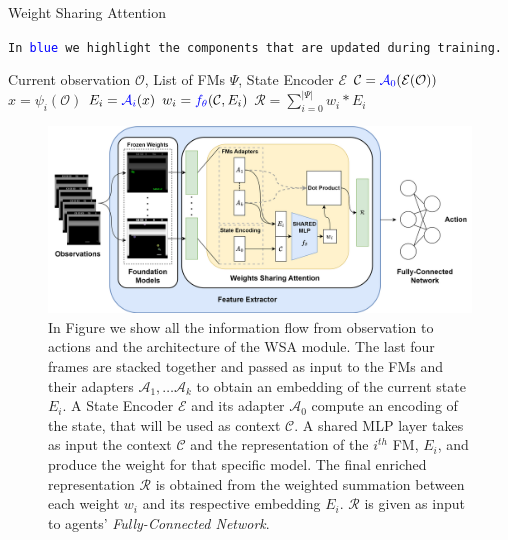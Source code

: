 \begin{algorithm}[ht]
    \caption{Weight Sharing Attention}\label{alg:wsa}
    \texttt{In \textcolor{blue}{blue} we highlight the components that are updated during training.}\\
    \begin{algorithmic}[1]
        \Require Current observation $\mathcal{O}$, List of FMs $\Psi$, State Encoder $\mathcal{E}$
        \State $\mathcal{C} = \textcolor{blue}{\mathcal{A}_0}(\mathcal{E}(\mathcal{O}))$ 
            \State $x = \psi_i(\mathcal{O})$ 
            \State $E_i = \textcolor{blue}{\mathcal{A}_i}(x)$ 
            \State $w_i = \textcolor{blue}{f_\theta}(\mathcal{C}, E_i)$ 
        \EndFor
        \State $\mathcal{R} = \sum_{i=0}^{|\Psi|} w_i * E_i$ 
    \end{algorithmic}
\end{algorithm}



\begin{figure}[ht]
    \begin{center}
        \includegraphics[width=1\textwidth]{images/main_architecture2}
    \end{center}
    \caption{In Figure we show all the information flow from observation to actions and the architecture of the WSA module. The last four frames are stacked together and passed as input to the FMs and their adapters $\mathcal{A}_1, \dots \mathcal{A}_k$ to obtain an embedding of the current state $E_i$. A State Encoder $\mathcal{E}$ and its adapter $\mathcal{A}_0$ compute an encoding of the state, that will be used as context $\mathcal{C}$. A shared MLP layer takes as input the context $\mathcal{C}$ and the representation of the $i^{th}$ FM, $E_i$, and produce the weight for that specific model. The final enriched representation $\mathcal{R}$ is obtained from the weighted summation between each weight $w_i$ and its respective embedding $E_i$. $\mathcal{R}$ is given as input to agents' \textit{Fully-Connected Network}.}
    \label{fig:main_architecture}
\end{figure}

